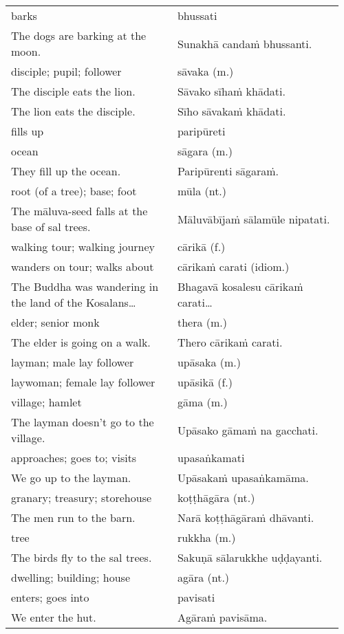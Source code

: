 \documentclass[a5paper]{memoir}
\begin{document}
\begin{longtable}{L{0.48\linewidth} L{0.48\linewidth}}
barks & bhussati\\[0pt]
The dogs are barking at the moon. & Sunakhā candaṁ bhussanti.\\[0pt]
disciple; pupil; follower & sāvaka (m.)\\[0pt]
The disciple eats the lion. & Sāvako sīhaṁ khādati.\\[0pt]
The lion eats the disciple. & Sīho sāvakaṁ khādati.\\[0pt]
fills up & paripūreti\\[0pt]
ocean & sāgara (m.)\\[0pt]
They fill up the ocean. & Paripūrenti sāgaraṁ.\\[0pt]
root (of a tree); base; foot & mūla (nt.)\\[0pt]
The māluva-seed falls at the base of sal trees. & Māluvābījaṁ sālamūle nipatati.\\[0pt]
walking tour; walking journey & cārikā (f.)\\[0pt]
wanders on tour; walks about & cārikaṁ carati (idiom.)\\[0pt]
The Buddha was wandering in the land of the Kosalans\ldots{} & Bhagavā kosalesu cārikaṁ carati\ldots{}\\[0pt]
elder; senior monk & thera (m.)\\[0pt]
The elder is going on a walk. & Thero cārikaṁ carati.\\[0pt]
layman; male lay follower & upāsaka (m.)\\[0pt]
laywoman; female lay follower & upāsikā (f.)\\[0pt]
village; hamlet & gāma (m.)\\[0pt]
The layman doesn't go to the village. & Upāsako gāmaṁ na gacchati.\\[0pt]
approaches; goes to; visits & upasaṅkamati\\[0pt]
We go up to the layman. & Upāsakaṁ upasaṅkamāma.\\[0pt]
granary; treasury; storehouse & koṭṭhāgāra (nt.)\\[0pt]
The men run to the barn. & Narā koṭṭhāgāraṁ dhāvanti.\\[0pt]
tree & rukkha (m.)\\[0pt]
The birds fly to the sal trees. & Sakuṇā sālarukkhe uḍḍayanti.\\[0pt]
dwelling; building; house & agāra (nt.)\\[0pt]
enters; goes into & pavisati\\[0pt]
We enter the hut. & Agāraṁ pavisāma.\\[0pt]

\end{longtable}
\end{document}
